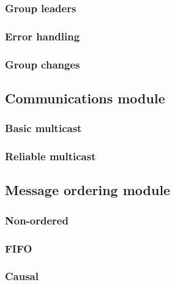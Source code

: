 \documentclass[titlepage, twocolumn, a4paper, 10pt]{article}
\begin{document}
\subsubsection{Group leaders}\label{sec:group-leaders}

\subsubsection{Error handling}\label{sec:error-handling}

\subsubsection{Group changes}\label{sec:group-changes}


\subsection{Communications module}\label{sec:communications-module}
\subsubsection{Basic multicast}\label{sec:basic-multicast}
\subsubsection{Reliable multicast}\label{sec:reliable-multicast}


\subsection{Message ordering module}\label{sec:message-ordering-module}
\subsubsection{Non-ordered}\label{sec:-non-ordered}
\subsubsection{FIFO}\label{sec:fifo}
\subsubsection{Causal}\label{sec:causal}
\end{document}
